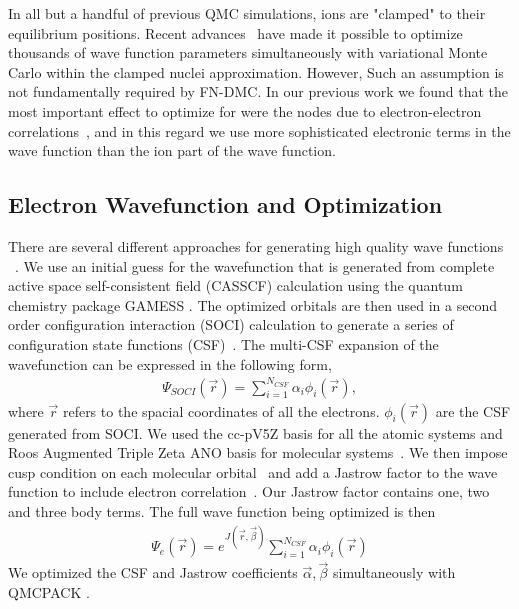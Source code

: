\documentclass[pra,superscriptaddress,groupedaddress,twocolumn]{revtex4}
\begin{document}
In all but a handful of previous QMC simulations, ions are "clamped" to their equilibrium positions. Recent advances~\cite{Nightingale_Linear,Umrigar_Linear,Brown_Bench} have made it possible to optimize thousands of wave function parameters simultaneously with variational Monte Carlo within the clamped nuclei approximation. However, Such an assumption is not fundamentally required by FN-DMC.  In our previous work we found that the most important effect to optimize for were the nodes due to electron-electron correlations~\cite{Tubman_ECG}, and in this regard we use more sophisticated electronic terms in the wave function than the ion part of the wave function.

\subsection{Electron Wavefunction and Optimization}
There are several different approaches for generating high quality wave functions ~\cite{Umrigar_Alleviation,Toulouse_Bench, Brown_Bench,Seth_Bench}. We use an initial guess for the wavefunction that is generated from complete active space self-consistent field (CASSCF) \cite{Chaban_MCSCF,Szabo} calculation using the quantum chemistry package GAMESS \cite{GAMESS}. The optimized orbitals are then used in a second order configuration interaction (SOCI) calculation to generate a series of configuration state functions (CSF)~\cite{Clark_Bench}. The multi-CSF expansion of the wavefunction  can be expressed in the following form,
\begin{align}
\Psi_{SOCI}(\vec{r})=\sum\limits_{i=1}^{N_{CSF}}\alpha_i\phi_i(\vec{r}), \label{eq:psi_gms}
\end{align}
where $\vec{r}$ refers to the spacial coordinates of all the electrons. $\phi_i(\vec{r})$ are the CSF generated from SOCI. We used the cc-pV5Z basis for all the atomic systems and Roos Augmented Triple Zeta ANO basis for molecular systems~\cite{dunning,roos}. We then impose cusp condition on each molecular orbital~\cite{cusp} and add a Jastrow factor to the wave function to include electron correlation~\cite{Kato}. Our Jastrow factor contains one, two and three body terms. The full wave function being optimized is then
\begin{align}
\Psi_e(\vec{r})=e^{J(\vec{r},\vec{\beta})}\sum\limits_{i=1}^{N_{CSF}}\alpha_i\phi_i(\vec{r})\label{eq:psie}
\end{align}
We optimized the CSF and Jastrow coefficients $\vec{\alpha},\vec{\beta}$ simultaneously with QMCPACK \cite{QMCPACK}.
\end{document}
